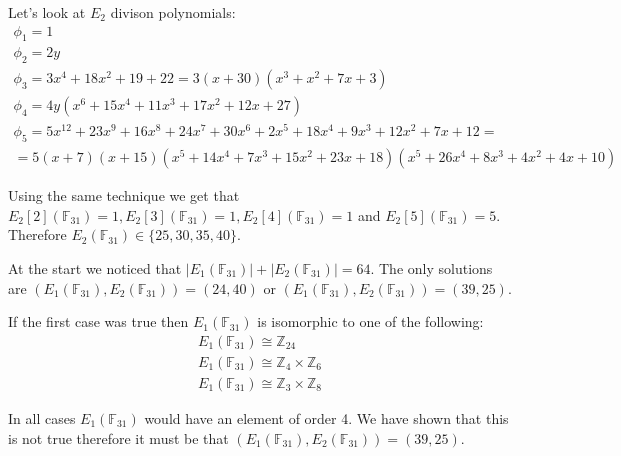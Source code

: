 \documentclass[12pt, a4paper]{article}
\begin{document}
Let's look at $E_2$ divison polynomials:
\begin{gather*}
\phi_1= 1\\
\phi_2 = 2y\\
\phi_3 = 3x^4+18x^2+19+22 = 3(x+30)(x^3+x^2+7x+3)\\
\phi_4 = 4y(x^6+15x^4+11x^3+17x^2+12x+27)\\
\phi_5 = 5x^{12}+23x^9+16x^8+24x^7+30x^6+2x^5+18x^4+9x^3+12x^2+7x+12 = \\
=5(x+7)(x+15)(x^5+14x^4+7x^3+15x^2+23x+18)(x^5+26x^4+8x^3+4x^2+4x+10)
\end{gather*}

Using the same technique we get that $E_2[2](\mathbb{F}_{31})=1, E_2[3](\mathbb{F}_{31})=1, E_2[4](\mathbb{F}_{31})=1$ and $E_2[5](\mathbb{F}_{31})=5$. Therefore $E_2(\mathbb{F}_{31}) \in \{25, 30, 35, 40\} $.

At the start we noticed that $|E_1(\mathbb{F}_{31})|+|E_2(\mathbb{F}_{31})|=64$. The only solutions are $(E_1(\mathbb{F}_{31}), E_2(\mathbb{F}_{31})) = (24, 40)$ or $(E_1(\mathbb{F}_{31}), E_2(\mathbb{F}_{31})) = (39, 25)$.

If the first case was true then $E_1(\mathbb{F}_{31})$ is isomorphic to one of the following:
\begin{gather*}
E_1(\mathbb{F}_{31}) \cong \mathbb{Z}_{24}\\
E_1(\mathbb{F}_{31}) \cong \mathbb{Z}_4 \times \mathbb{Z}_6\\
E_1(\mathbb{F}_{31}) \cong \mathbb{Z}_3 \times \mathbb{Z}_8
\end{gather*}

In all cases $E_1(\mathbb{F}_{31})$ would have an element of order 4. We have shown that this is not true therefore it must be that $(E_1(\mathbb{F}_{31}), E_2(\mathbb{F}_{31})) = (39, 25)$.
\end{document}
